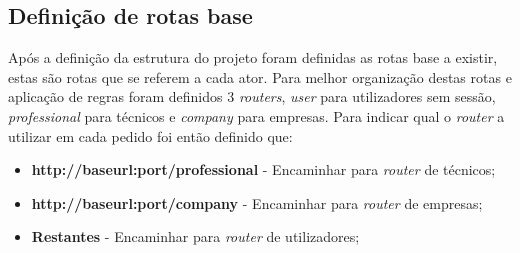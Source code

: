 \subsection{Definição de rotas base}
Após a definição da estrutura do projeto foram definidas as rotas base a existir, estas são rotas que se referem a cada ator. Para melhor organização destas rotas e aplicação de regras foram definidos 3 \textit{routers}, \textit{user} para utilizadores sem sessão, \textit{professional} para técnicos e \textit{company} para empresas. Para indicar qual o \textit{router} a utilizar em cada pedido foi então definido que:
\begin{itemize}
  \item \textbf{http://baseurl:port/professional} - Encaminhar para \textit{router} de técnicos;
  \item \textbf{http://baseurl:port/company} - Encaminhar para \textit{router} de empresas;
  \item \textbf{Restantes} - Encaminhar para \textit{router} de utilizadores;
\end{itemize}